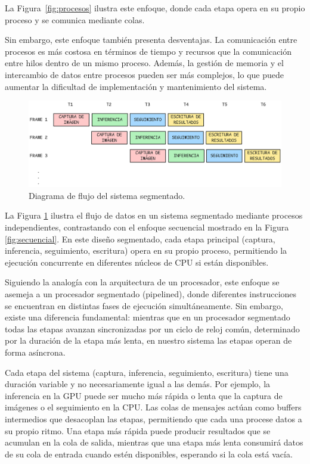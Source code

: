 \documentclass[11pt,spanish,listoffigures,listoftables]{tfgetsinf}
\begin{document}
La Figura~\ref{fig:procesos} ilustra este enfoque, donde cada etapa opera en su propio proceso y se comunica mediante colas.

Sin embargo, este enfoque también presenta desventajas. La comunicación entre procesos es más costosa en términos de tiempo y recursos que la comunicación entre hilos dentro de un mismo proceso. Además, la gestión de memoria y el intercambio de datos entre procesos pueden ser más complejos, lo que puede aumentar la dificultad de implementación y mantenimiento del sistema.

\begin{figure}[H]
   \centering
   \includegraphics[width=1\textwidth]{images/diseno_e_implementacion/segmentacion.png}
   \caption{Diagrama de flujo del sistema segmentado.}
   \label{fig:segmentacion}
\end{figure}

La Figura \ref{fig:segmentacion} ilustra el flujo de datos en un sistema segmentado mediante procesos independientes, contrastando con el enfoque secuencial mostrado en la Figura \ref{fig:secuencial}. En este diseño segmentado, cada etapa principal (captura, inferencia, seguimiento, escritura) opera en su propio proceso, permitiendo la ejecución concurrente en diferentes núcleos de CPU si están disponibles.

Siguiendo la analogía con la arquitectura de un procesador, este enfoque se asemeja a un procesador segmentado (pipelined), donde diferentes instrucciones se encuentran en distintas fases de ejecución simultáneamente. Sin embargo, existe una diferencia fundamental: mientras que en un procesador segmentado todas las etapas avanzan sincronizadas por un ciclo de reloj común, determinado por la duración de la etapa más lenta, en nuestro sistema las etapas operan de forma asíncrona.

Cada etapa del sistema (captura, inferencia, seguimiento, escritura) tiene una duración variable y no necesariamente igual a las demás. Por ejemplo, la inferencia en la GPU puede ser mucho más rápida o lenta que la captura de imágenes o el seguimiento en la CPU. Las colas de mensajes actúan como buffers intermedios que desacoplan las etapas, permitiendo que cada una procese datos a su propio ritmo. Una etapa más rápida puede producir resultados que se acumulan en la cola de salida, mientras que una etapa más lenta consumirá datos de su cola de entrada cuando estén disponibles, esperando si la cola está vacía.
\end{document}

